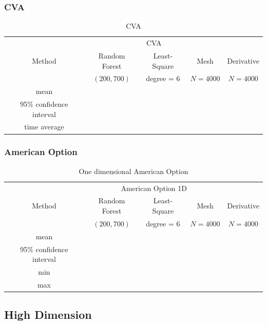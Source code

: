 \documentclass[english,11pt,openany]{article}
\theoremstyle{definition}
\theoremstyle{plain}
\theoremstyle{definition}
\begin{document}
	
	\subsubsection{CVA}
	
	\begin{table}[H]
		\centering
		\caption{CVA}\label{table:CVA}
		\begin{tabular}{*5c}
			\toprule
			& \multicolumn{3}{c}{CVA} \\
			\cmidrule(lr){2-4}
			Method & Random Forest  & Least-Square & Mesh & Derivative \\    
			& $(200, 700)$ & degree = $6$     & $N = 4 000$ &  $N = 4 000$ \\
			\midrule
			mean &        &  &       \\ 
			95\% confidence interval &        &        &  \\
			time average &        &  &  \\
			\bottomrule
		\end{tabular}
	\end{table}
	
	
	\subsubsection{American Option}
	
	
	\begin{table}[H]
		\centering
		\caption{One dimensional American Option}\label{table:amoption}
		\begin{tabular}{*5c}
			\toprule
			& \multicolumn{3}{c}{American Option 1D} \\
			\cmidrule(lr){2-4}
			Method & Random Forest  & Least-Square & Mesh & Derivative \\    
			& $(200, 700)$ & degree = $6$     & $N = 4 000$ &  $N = 4 000$ \\
			\midrule
			mean &        &  &       \\ 
			95\% confidence interval &        &        &  \\
			min &        &  &  \\
			max &  &        &        \\
			\bottomrule
		\end{tabular}
	\end{table}
	
	
	\subsection{High Dimension}
	
\end{document}
